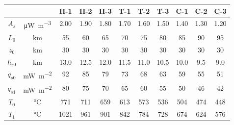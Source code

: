 \begin{tabular}{ccccccccccc}
\toprule
& & H-1 & H-2 & H-3 & T-1 & T-2 & T-3 & C-1 & C-2 & C-3 \\
\midrule
$A_{s}$ & \si{\uW\per\m\cubed} & 2.00 & 1.90 & 1.80 & 1.70 & 1.60 & 1.50 & 1.40 & 1.30 & 1.20 \\
$L_{0}$ & \si{\km} & 55 & 60 & 65 & 70 & 75 & 80 & 85 & 90 & 95 \\
$z_{0}$ & \si{\km} & 30 & 30 & 30 & 30 & 30 & 30 & 30 & 30 & 30 \\
$h_{r0}$ & \si{\km} & 13.0 & 12.5 & 12.0 & 11.5 & 11.0 & 10.5 & 10.0 & 9.5 & 9.0 \\
\midrule
$q_{s0}$ & \si{\mW\per\m\squared} & 92 & 85 & 79 & 73 & 68 & 63 & 59 & 55 & 51 \\
$q_{s1}$ & \si{\mW\per\m\squared} & 80 & 75 & 70 & 65 & 60 & 55 & 50 & 46 & 42 \\
$T_{0}$ & \si{\degreeCelsius} & 771 & 711 & 659 & 613 & 573 & 536 & 504 & 474 & 448 \\
$T_{1}$ & \si{\degreeCelsius} & 1021 & 961 & 901 & 842 & 784 & 728 & 674 & 624 & 576 \\
\bottomrule
\end{tabular}

